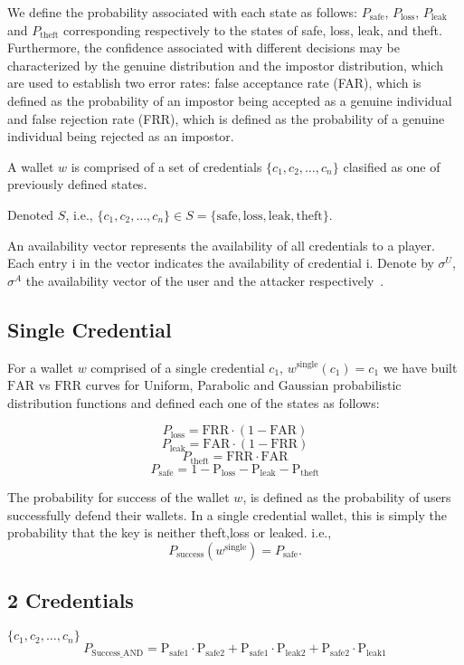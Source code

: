 \documentclass{article}
\begin{document}
We define the probability associated with each state as follows: $P_{\text{safe}}$, $P_{\text{loss}}$, $P_{\text{leak}}$ and $P_{\text{theft}}$ corresponding respectively to the states of safe, loss, leak, and theft. Furthermore, the confidence associated with different decisions may be characterized by the genuine distribution and the impostor distribution, which are used to establish two error rates: false acceptance rate (FAR), which is defined as the probability of an impostor being accepted as a genuine individual and false rejection rate (FRR), which is defined as the probability of a genuine individual being rejected as an impostor.

A wallet $w$ is comprised of a set of credentials $\{c_1, c_2, \ldots, c_n\}$ clasified as one of previously defined states.

Denoted $S$, i.e., $\{c_1, c_2, \ldots, c_n\} \in S = \{ \text{safe}, \text{loss}, \text{leak}, \text{theft} \}$.

An availability vector represents the availability of all credentials to a player. Each entry i in the vector indicates the availability of credential i. Denote by $\sigma^U$,$\sigma^A$ the availability vector of the user and the attacker respectively~\cite{mouallem2024}.

\subsection{Single Credential}
For a wallet $w$ comprised of a single credential $c_1$, $w^\text{single}(c_1)=c_1$ we have built $\mathrm{FAR}$ vs $\mathrm{FRR}$ curves for Uniform, Parabolic and Gaussian probabilistic distribution functions and defined each one of the states as follows:

\[
P_{\text{loss}} = \mathrm{FRR} \cdot (1 - \mathrm{FAR})
\]
\[
P_{\text{leak}} = \mathrm{FAR} \cdot (1 - \mathrm{FRR})
\]
\[
P_{\text{theft}}=\mathrm{FRR} \cdot \mathrm{FAR}
\]
\[
P_{{\text{safe}}}=1-\mathrm{P_{\text{loss}}}-\mathrm{P_{\text{leak}}}-\mathrm{P_{\text{theft}}}
\]

The probability for success of the wallet $w$, is defined as the probability of users successfully defend their wallets. In a single credential wallet, this is simply the probability that the key is neither theft,loss or leaked. i.e.,
\[
P_{\text{success}}(w^{\text{single}}) = P_{{\text{safe}}}.
\]
\subsection{2 Credentials}
$\{c_1, c_2, \ldots, c_n\}$
\[
P_{\text{Success\_AND}} = \mathrm{P_{\text{safe1}}} \cdot \mathrm{P_{\text{safe2}}} + \mathrm{P_{\text{safe1}}} \cdot \mathrm{P_{\text{leak2}}} + \mathrm{P_{\text{safe2}}} \cdot \mathrm{P_{\text{leak1}}}
\]
\end{document}
